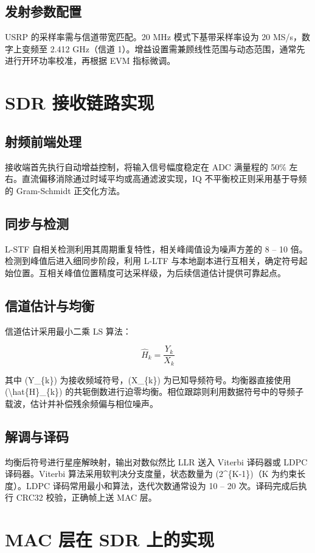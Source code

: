 \section{发射参数配置}
USRP 的采样率需与信道带宽匹配。20 MHz 模式下基带采样率设为 20 MS/s，数字上变频至 2.412 GHz（信道 1）。增益设置需兼顾线性范围与动态范围，通常先进行开环功率校准，再根据 EVM 指标微调。\par
\chapter{SDR 接收链路实现}
\section{射频前端处理}
接收端首先执行自动增益控制，将输入信号幅度稳定在 ADC 满量程的 50\%{} 左右。直流偏移消除通过时域平均或高通滤波实现，IQ 不平衡校正则采用基于导频的 Gram-Schmidt 正交化方法。\par
\section{同步与检测}
L-STF 自相关检测利用其周期重复特性，相关峰阈值设为噪声方差的 8 – 10 倍。检测到峰值后进入细同步阶段，利用 L-LTF 与本地副本进行互相关，确定符号起始位置。互相关峰值位置精度可达采样级，为后续信道估计提供可靠起点。\par
\section{信道估计与均衡}
信道估计采用最小二乘 LS 算法：\par
$$ \hat{H}_{k} = \frac{Y_{k}}{X_{k}} $$\par
其中 (Y\_{}\{{}k\}{}) 为接收频域符号，(X\_{}\{{}k\}{}) 为已知导频符号。均衡器直接使用 (\textbackslash{}hat\{{}H\}{}\_{}\{{}k\}{}) 的共轭倒数进行迫零均衡。相位跟踪则利用数据符号中的导频子载波，估计并补偿残余频偏与相位噪声。\par
\section{解调与译码}
均衡后符号进行星座解映射，输出对数似然比 LLR 送入 Viterbi 译码器或 LDPC 译码器。Viterbi 算法采用软判决分支度量，状态数量为 (2\^{}\{{}K-1\}{})（K 为约束长度）。LDPC 译码常用最小和算法，迭代次数通常设为 10 – 20 次。译码完成后执行 CRC32 校验，正确帧上送 MAC 层。\par
\chapter{MAC 层在 SDR 上的实现}
